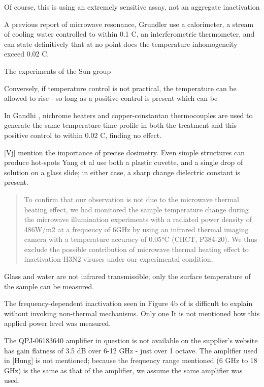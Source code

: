 \documentclass[paper.tex]{subfiles}
\begin{document}
\begin{multicols}{1}
Of course, this is using an extremely sensitive assay, not an aggregate inactivation 

A previous report of microwave resonance, Grundler \cite{Sharp1983} use a calorimeter, a stream of cooling water controlled to within 0.1 C, an interferometric thermometer, and can state definitively that at no point does the temperature inhomogeneity exceed 0.02 C.

The experiments of the Sun group 

Conversely, if temperature control is not practical, the temperature can be allowed to rise - so long as a positive control is present which can be  

In Gandhi \cite{Basic1983}, nichrome heaters and copper-constantan thermocouples are used to generate the same temperature-time profile in both the treatment and this positive control to within 0.02 C, finding no effect. 


[Vj] mention the importance of precise dosimetry. Even simple structures can produce hot-spots 
Yang et al use both a plastic cuvette, and a single drop of solution on a glass slide; in either case, a sharp change dielectric constant is present.

\begin{quote}
	To confirm that our observation is not due to the microwave thermal heating effect, we had monitored the sample temperature change during the microwave illumination experiments with a radiated power density of 486W/m2 at a frequency of 6GHz by using an infrared thermal imaging camera with a temperature accuracy of 0.05°C (CHCT, P384-20).  We thus exclude the possible contribution of microwave thermal heating effect to inactivation H3N2 viruses under our experimental condition.
\end{quote}

Glass and water are not infrared transmissible; only the surface temperature of the sample can be measured. 

The frequency-dependent inactivation seen in Figure 4b of \cite{Efficient2015} is difficult to explain without invoking non-thermal mechanisms. Only one  It is not mentioned how this applied power level was measured. 

The QPJ-06183640 amplifier in question is not available on the supplier's website \cite{Microwaved} has gain flatness of 3.5 dB over 6-12 GHz - just over 1 octave. The amplifier used in [Hung] is not mentioned; because the frequency range mentioned (6 GHz to 18 GHz) is the same as that of the amplifier, we assume the same amplifier was used. 


\end{multicols}
\end{document}
